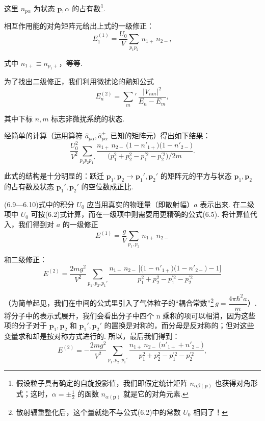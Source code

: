 这里 $n_{p\alpha}$ 为状态 $\bm p,\alpha$ 的占有数\footnote{假设粒子具有确定的自旋投影值，我们即假定统计矩阵 $n_{\alpha\beta(\bm p)}$ 也获得对角形式；这时，$\alpha=\pm\frac{1}{2}$ 的函数 $n_{\alpha(\bm p)}$ 就是它的对角元素.}.

相互作用能的对角矩阵元给出上式的一级修正：
\begin{equation}
E_{1}^{(1)}=\frac{U_{0}}{V}\sum_{p_{1}p_{2}}\,n_{1+}\,n_{2-},
\end{equation}

式中 $n_{1+}\equiv n_{p_{1}+}$，等等.

为了找出二级修正，我们利用微扰论的熟知公式
\begin{equation*}
E_{n}^{(2)}=\sum_{m}{}'\,\frac{|V_{nm}|^{2}}{E_{n}-E_{m}},
\end{equation*}

其中下标 $n,m$ 标志非微扰系统的状态.

经简单的计算（运用算符 $\hat a_{p\alpha},\hat a^{+}_{p\alpha}$ 已知的矩阵元）得出如下结果：
\begin{equation}
\frac{U_{0}^{2}}{V^{2}}\sum_{p_{1}p_{2}p_{1}'}
\frac{n_{1+}\,n_{2-}\,\bigl(1-n'_{1+}\bigr)\bigl(1-n'_{2-}\bigr)}
{\bigl(p_{1}^{2}+p_{2}^{2}-p_{1}^{\prime2}-p_{2}^{\prime2}\bigr)/2m}.
\end{equation}

此式的结构是十分明显的：跃迁 $\bm p_{1},\bm p_{2}\to\bm p_{1}',\bm p_{2}'$ 的矩阵元的平方与状态 $\bm p_{1},\bm p_{2}$ 的占有数及状态 $\bm p_{1}',\bm p_{2}'$ 的空位数成正比.

(6.9—6.10)式中的积分 $U_{0}$ 应当用真实的物理量（即散射幅）$a$ 表示出来. 在二级项中 $U_{0}$ 可按(6.2)式计算，而在一级项中则需要用更精确的公式(6.5). 将计算值代入，我们得到对 $a$ 的一级修正
\begin{equation}
E^{(1)}=\frac{g}{V}\sum_{p_{1},p_{2}}\,n_{1+}\,n_{2-}
\end{equation}

和二级修正：
\begin{equation*}
E^{(2)}=\frac{2mg^{2}}{V^{2}}\sum_{p_{1},p_{2},p_{1}'}
\frac{n_{1+}\,n_{2-}\,\bigl[\bigl(1-n'_{1+}\bigr)\bigl(1-n'_{2-}\bigr)-1\bigr]}
{p_{1}^{2}+p_{2}^{2}-p_{1}^{\prime2}-p_{2}^{\prime2}}
\end{equation*}

（为简单起见，我们在中间的公式里引入了气体粒子的“耦合常数”\footnote{散射辐重整化后，这个量就绝不与公式(6.2)中的常数 $U_{0}$ 相同了！}$\ g=\dfrac{4\pi\hbar^{2}a}{m}$）. 将分子中的表示式展开，我们会看出分子中四个 n 乘积的项可以相消，因为这些项的分子对于 $\bm p_{1},\bm p_{2}$ 和 $\bm p_{1}',\bm p_{2}'$ 的置换是对称的，而分母是反对称的；但对这些变量求和却是按对称方式进行的. 所以，最后我们得到：
\begin{equation}
E^{(2)}=-\frac{2mg^{2}}{V^{2}}\sum_{p_{1},p_{2},p_{1}'}
\frac{n_{1+}\,n_{2-}\,\bigl(n'_{1+}+n'_{2-}\bigr)}
{p_{1}^{2}+p_{2}^{2}-p_{1}^{\prime2}-p_{2}^{\prime2}},
\end{equation}

